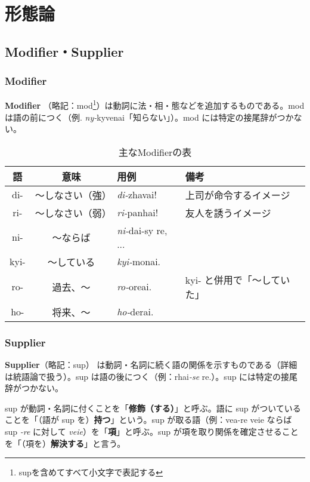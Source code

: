 \section{形態論}

\subsection{Modifier・Supplier}

\subsubsection{Modifier}
\textbf{Modifier} （略記：mod\footnote{supを含めてすべて小文字で表記する}）は動詞に法・相・態などを追加するものである。mod は語の前につく（例. \emph{ny-}kyvenai「知らない」）。mod には特定の接尾辞がつかない。

\begin{table}[h]
    \centering
    \caption{主なModifierの表}
    \begin{tabular}{ccll}
        \hline
        語 & 意味 & 用例 & 備考 \\
        \hline \hline
        di-  & ～しなさい（強） & \emph{di-}zhavai! & 上司が命令するイメージ \\
        ri-  & ～しなさい（弱） & \emph{ri-}panhai! & 友人を誘うイメージ\\
        ni-  & ～ならば   & \emph{ni-}dai-sy re, ...& \\
        kyi- & ～している & \emph{kyi-}monai. & \\
        ro-  & 過去、～   & \emph{ro-}oreai. & kyi- と併用で「～していた」\\
        ho-  & 将来、～   & \emph{ho-}derai. & \\
        \hline
    \end{tabular}
\end{table}

\subsubsection{Supplier}

\textbf{Supplier}（略記：sup） は動詞・名詞に続く語の関係を示すものである（詳細は統語論で扱う）。sup は語の後につく（例：rhai\emph{-se} re.）。sup には特定の接尾辞がつかない。

sup が動詞・名詞に付くことを「\textbf{修飾（する）}」と呼ぶ。語に sup がついていることを「（語が sup を）\textbf{持つ}」という。sup が取る語（例：vea-re veie ならば sup \emph{-re} に対して \emph{veie}）を「\textbf{項}」と呼ぶ。sup が項を取り関係を確定させることを「（項を）\textbf{解決する}」と言う。

